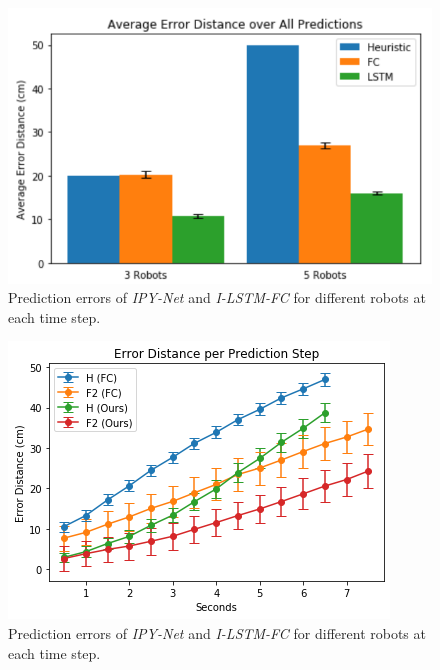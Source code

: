 \documentclass[letterpaper, 10 pt, conference]{ieeeconf}  %
\begin{document}
	
	

	\begin{figure}[t]
	\centering
	\includegraphics[width=1.\columnwidth]{fig_macro_eval}
	\caption{Prediction errors of \emph{IPY-Net} and \emph{I-LSTM-FC} 
		for different robots at each time step.  
	}
	\label{fig:macro_eval}
	\end{figure}


	\begin{figure}[t]
		\centering
		\includegraphics[width=1.\columnwidth]{fig_micro_eval}
		\caption{Prediction errors of \emph{IPY-Net} and \emph{I-LSTM-FC} 
			for different robots at each time step.  
		}
		\label{fig:micro_eval}
	\end{figure}
\end{document}
